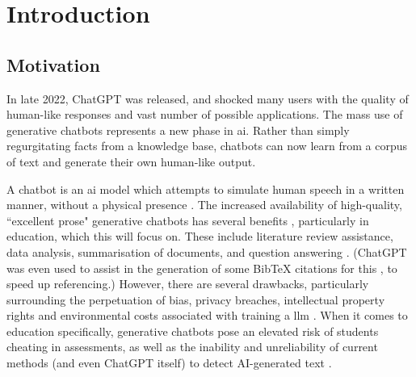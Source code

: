 \chapter{Introduction}\label{ch:introduction}




\section{Motivation} %
\label{sec:intro_motivation}

In late 2022, ChatGPT was released, and shocked many users with the quality of human-like responses and vast number of possible applications. The mass use of generative chatbots represents a new phase in \acrfull{ai}. Rather than simply regurgitating facts from a knowledge base, chatbots can now learn from a corpus of text and generate their own human-like output.

A chatbot is an \acrshort{ai} model which attempts to simulate human speech in a written manner, without a physical presence \citep{Nee2023ExploringTT}. The increased availability of high-quality, ``excellent prose" generative chatbots has several benefits \citep{Floridi}, particularly in education, which this \papertype will focus on. These include literature review assistance, data analysis, summarisation of documents, and question answering \citep{lund2023chatting}. (ChatGPT was even used to assist in the generation of some BibTeX citations for this \papertype, to speed up referencing.) However, there are several drawbacks, particularly surrounding the perpetuation of bias, privacy breaches, intellectual property rights and environmental costs associated with training a \acrfull{llm} \citep{Jungherr, Bender21}. When it comes to education specifically, generative chatbots pose an elevated risk of students cheating in assessments, as well as the inability and unreliability of current methods (and even ChatGPT itself) to detect AI-generated text \citep{susnjak2022, Cotton}.

